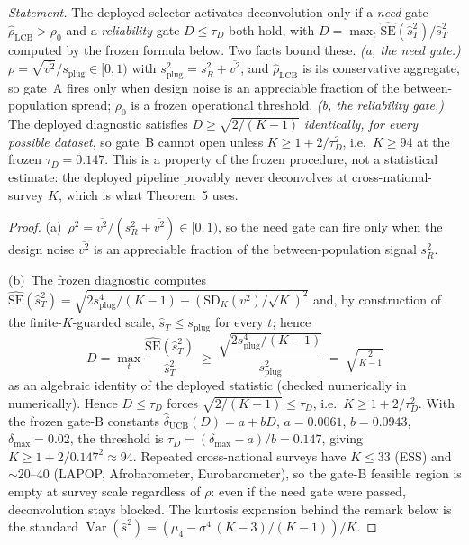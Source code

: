 \documentclass[12pt]{article}
\theoremstyle{definition}
\theoremstyle{remark}
\newcommand{\rhohat}{\widehat{\rho}}
\begin{document}
\emph{Statement.} The deployed selector activates deconvolution only if a \emph{need} gate
$\rhohat_{\mathrm{LCB}}>\rho_0$ and a \emph{reliability} gate $D\le\tau_D$ both hold, with
$D=\max_t\widehat{\mathrm{SE}}(\widehat s_T^2)/\widehat s_T^2$ computed by the frozen
formula below. Two facts bound these.
\emph{(a, the need gate.)} $\rho=\sqrt{\overline{v^2}}/s_{\mathrm{plug}}
\in[0,1)$ with $s_{\mathrm{plug}}^2=s_R^2+\overline{v^2}$, and
$\rhohat_{\mathrm{LCB}}$ is its conservative aggregate, so gate~A fires only
when design noise is an appreciable fraction of the between-population
spread; $\rho_0$ is a frozen operational threshold.
\emph{(b, the reliability gate.)} The deployed diagnostic satisfies
$D\ge\sqrt{2/(K-1)}$ \emph{identically, for every possible dataset}, so
gate~B cannot open unless $K\ge1+2/\tau_D^2$, i.e.\ $K\ge94$ at the frozen
$\tau_D=0.147$. This is a property of the frozen procedure, not a statistical
estimate: the deployed pipeline provably never deconvolves at
cross-national-survey $K$, which is what Theorem~5 uses.

\begin{proof}
(a)~$\rho^2=\overline{v^2}/(s_R^2+\overline{v^2})\in[0,1)$, so the need gate can fire only
when the design noise $\overline{v^2}$ is an appreciable fraction of the between-population
signal $s_R^2$.

(b)~The frozen diagnostic computes
$\widehat{\mathrm{SE}}(\widehat s_T^2)=\sqrt{2s_{\mathrm{plug}}^4/(K-1)+(\mathrm{SD}_K(v^2)
/\sqrt K)^2}$ and, by construction of the finite-$K$-guarded scale,
$\widehat s_T\le s_{\mathrm{plug}}$ for every $t$; hence
\[
D=\max_t\frac{\widehat{\mathrm{SE}}(\widehat s_T^2)}{\widehat s_T^2}
\ \ge\ \frac{\sqrt{2s_{\mathrm{plug}}^4/(K-1)}}{s_{\mathrm{plug}}^2}
\ =\ \sqrt{\tfrac{2}{K-1}}
\]
as an algebraic identity of the deployed statistic (checked numerically in
numerically). Hence $D\le\tau_D$ forces $\sqrt{2/(K-1)}\le\tau_D$,
i.e.\ $K\ge1+2/\tau_D^2$. With the frozen gate-B constants
$\widehat\delta_{\mathrm{UCB}}(D)=a+bD$, $a=0.0061$, $b=0.0943$, $\delta_{\max}=0.02$, the
threshold is $\tau_D=(\delta_{\max}-a)/b=0.147$, giving $K\ge1+2/0.147^2\approx94$.
Repeated cross-national surveys have $K\le33$ (ESS) and $\sim20$--$40$ (LAPOP,
Afrobarometer, Eurobarometer), so the gate-B feasible region is empty at survey scale
regardless of $\rho$: even if the need gate were passed, deconvolution stays blocked.
The kurtosis expansion behind the remark below is the standard
$\operatorname{Var}(\widehat s^2)=(\mu_4-\sigma^4\,(K-3)/(K-1))/K$.
\end{proof}
\end{document}
